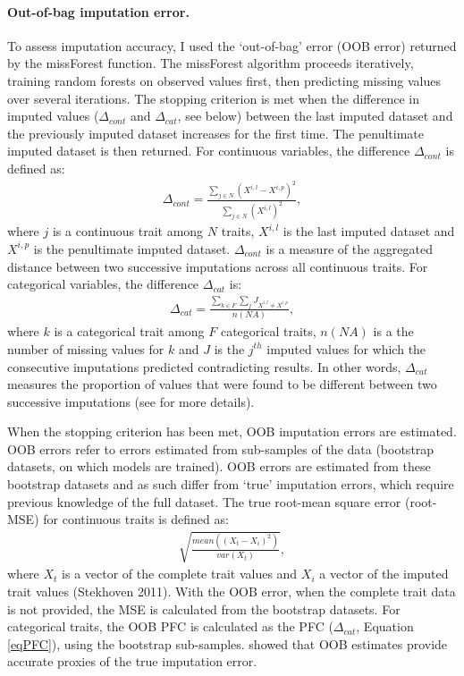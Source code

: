 \paragraph{Out-of-bag imputation error.}
To assess imputation accuracy, I used the `out-of-bag' error (OOB error) returned by the missForest function. The missForest algorithm proceeds iteratively, training random forests on observed values first, then predicting missing values over several iterations. The stopping criterion is met when the difference in imputed values ($\Delta_{cont}$ and $\Delta_{cat}$, see below) between the last imputed dataset and the previously imputed dataset increases for the first time. The penultimate imputed dataset is then returned. For continuous variables, the difference $\Delta_{cont}$  is defined as:
\begin{align}
\Delta_{cont}=\frac{\sum_{j \in N}\left(X^{i,l}-X^{i,p}\right)^2}{\sum_{j \in N}\left(X^{i,l}\right)^2}, 
\end{align}
where $j$ is a continuous trait among $N$ traits, $X^{i,l}$ is the last imputed dataset and $X^{i,p}$ is the penultimate imputed dataset.  $\Delta_{cont}$ is a measure of the aggregated distance between two successive imputations across all continuous traits.  For categorical variables, the difference $\Delta_{cat}$ is:
\begin{align}
\Delta_{cat}=\frac{\sum_{k \in F}\sum_{j} J_{X^{i,l}\neq X^{i,p}}}{n(NA)}, 
\label{eqPFC}
\end{align}
where $k$ is a categorical trait among $F$ categorical traits, $n(NA)$ is a the number of missing values for $k$ and $J$ is the $j^{th}$ imputed values for which the consecutive imputations predicted contradicting results. In other words, $\Delta_{cat}$ measures the proportion of values that were found to be different between two successive imputations
(see \cite{Stekhoven2012} for more details).

When the stopping criterion has been met, OOB imputation errors are estimated.
OOB errors refer to errors estimated from sub-samples of the data (bootstrap datasets, on which models are trained). OOB errors are estimated from these bootstrap datasets and as such differ from `true' imputation errors, which require previous knowledge of the full dataset. The true root-mean square error (root-MSE) for continuous traits is defined as: 
\begin{align}
\sqrt{\frac{mean\left(\left(X_t-X_i\right)^2\right)}{var\left(X_t\right)}}, 
\end{align}
where $X_t$ is a vector of the complete trait values and $X_i$ a vector of the imputed trait values (Stekhoven 2011). With the OOB error, when the complete trait data is not provided, the MSE is calculated from the bootstrap datasets. For categorical traits, the OOB PFC is calculated as the PFC ($\Delta_{cat}$, Equation \ref{eqPFC}), using the bootstrap sub-samples. \cite{Breiman2001} showed that OOB estimates provide accurate proxies of the true imputation error. 

